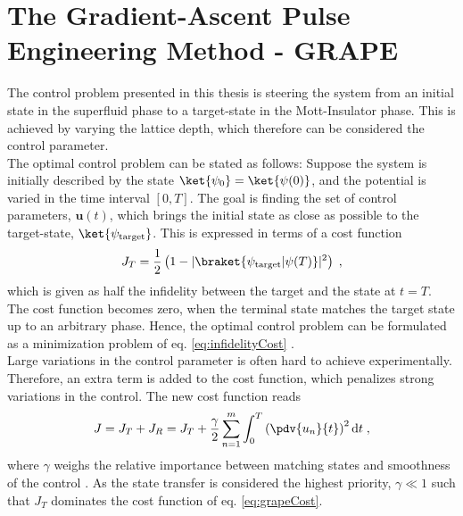 \section{The Gradient-Ascent Pulse Engineering Method - GRAPE} \label{sec:GRAPE}
The control problem presented in this thesis is steering the system from an initial state in the superfluid phase to a target-state in the Mott-Insulator phase. This is achieved by varying the lattice depth, which therefore can be considered the control parameter.\\
The optimal control problem can be stated as follows: 
Suppose the system is initially described by the state $\ket{\psi_0} = \ket{\psi (0)}$, and the potential is varied in the time interval $[ 0 , T]$. The goal is finding the set of control parameters, $\boldsymbol{u}(t)$, which brings the initial state as close as possible to the target-state, $\ket{\psi_{\mathrm{target}}}$. This is expressed in terms of a cost function
\begin{equation}
	J_T = \frac{1}{2} \left( 1-|\braket{\psi_{\mathrm{target}} | \psi (T)}|^2 \right) \; ,
	\label{eq:infidelityCost}
\end{equation}
which is given as half the infidelity between the target and the state at $t=T$. The cost function becomes zero, when the terminal state matches the target state up to an arbitrary phase. Hence, the optimal control problem can be formulated as a minimization problem of eq. \eqref{eq:infidelityCost} \cite{Jager2014}.\\
Large variations in the control parameter is often hard to achieve experimentally. Therefore, an extra term is added to the cost function, which penalizes strong variations in the control. The new cost function reads
\begin{equation}
	J = J_T + J_R = J_T + \frac{\gamma}{2} \sum_{n=1}^{m} \int_{0}^{T} \left( \pdv{u_n}{t} \right)^2 \mathrm{d}t \; ,
	\label{eq:grapeCost}
\end{equation}
where $\gamma$ weighs the relative importance between matching states and smoothness of the control \cite{Jager2014}. As the state transfer is considered the highest priority, $\gamma \ll 1$ such that $J_T$ dominates the cost function of eq. \eqref{eq:grapeCost}.\\

